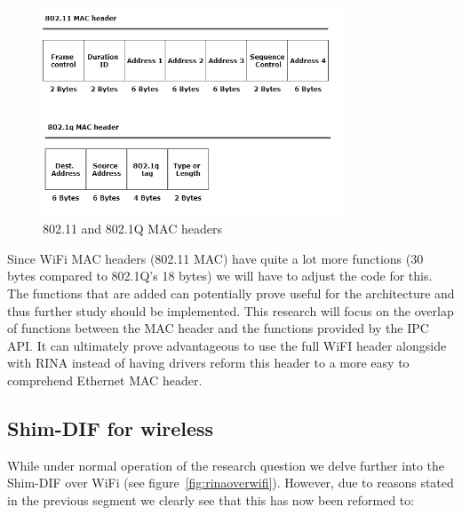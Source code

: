 \begin{figure}[H]
    \centering
    \includegraphics[width=0.8\textwidth]{figures/80211vs8021q}
    \caption{802.11 and 802.1Q MAC headers} 
    \label{fig:80211vs8021q}
\end{figure}

\npar

Since WiFi MAC headers (802.11 MAC) have quite a lot more functions (30 bytes compared to 802.1Q's 18 bytes) we will have to adjust the code for this. The functions that are added can potentially prove useful for the architecture and thus further study should be implemented. This research will focus on the overlap of functions between the MAC header and the functions provided by the IPC API. It can ultimately prove advantageous to use the full WiFI header alongside with RINA instead of having drivers reform this header to a more easy to comprehend Ethernet MAC header. 


\subsection{Shim-DIF for wireless}

While under normal operation of the research question we delve further into the Shim-DIF over WiFi (see figure~\ref{fig:rinaoverwifi}). However, due to reasons stated in the previous segment we clearly see that this has now been reformed to:

